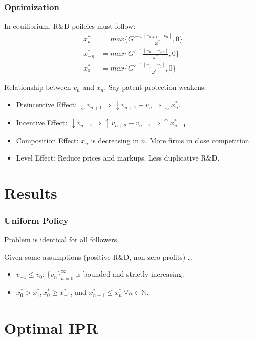 \documentclass{beamer}
\begin{document}
\begin{frame}[t]\frametitle{Optimization} 
  In equilibrium, R\&D poilcies must follow:
  \begin{align*} \label{eq:ss_rd_policies}
    x_n^*    &= max \big\{G'^{-1}\frac{[v_{n+1} - v_n]}{\omega^*}   ,0\}\\
    x_{-n}^* &= max \big\{G'^{-1}\frac{[v_0  - v_{-n}]}{\omega^*}   ,0\}\\
    x_0^*    &= max \big\{G'^{-1}\frac{[v_1     - v_0]}{\omega^*}   ,0\}
  \end{align*}

  Relationship between $v_n$ and $x_n$. Say patent protection weakens:
  \begin{itemize}
    \item<+-> Disincentive Effect: $\downarrow v_{n+1} \Rightarrow \downarrow v_{n+1} - v_n \Rightarrow \downarrow x_n^*$.
    \item<+-> Incentive Effect: $\downarrow v_{n+1} \Rightarrow \uparrow v_{n+2} - v_{n+1} \Rightarrow \uparrow x_{n+1}^*$.
    \item<+-> Composition Effect: $x_n$ is decreasing in $n$. More firms in close competition.
    \item<+-> Level Effect: Reduce prices and markups.  Less duplicative R\&D.
  \end{itemize}
\end{frame}

\section{Results}
\label{sec:results}
\begin{frame}[t]\frametitle{Uniform Policy} 
Problem is identical for all followers.

Given some assumptions (positive R\&D, non-zero profits) \ldots
\begin{itemize}
  \item<+-> $v_{-1} \leq v_0$; $\{v_n\}_{n=0}^{\infty}$ is bounded and strictly increasing.
  \item<+-> $x_0^* > x_1^*, x_0^* \geq x_{-1}^*$, and $x_{n+1}^* \leq x_n^*\ \forall n \in \mathbb{N}$.
\end{itemize}
\end{frame}

\section{Optimal IPR}
\label{sec:optimal_ipr}
\end{document}
